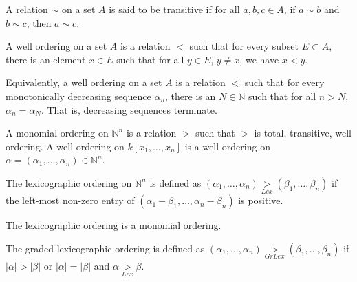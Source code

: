 \documentclass[crop=false,class=book,oneside]{standalone}
\begin{document}
            \begin{definition}
                A relation $\sim$ on a set $A$ is said to be
                transitive if for all $a,b,c\in A$, if $a\sim b$ and
                $b\sim c$, then $a\sim c$.
            \end{definition}
            \begin{definition}
                A well ordering on a set $A$ is a relation $<$
                such that for every subset $E\subset A$, there is an
                element $x\in E$ such that for all $y\in E$, $y\ne x$,
                we have $x<y$.
            \end{definition}
            \begin{remark}
                Equivalently, a well ordering on a set $A$
                is a relation $<$ such that for every monotonically
                decreasing sequence $\alpha_n$, there is an
                $N\in \mathbb{N}$ such that for all $n>N$,
                $\alpha_n = \alpha_N$. That is,
                decreasing sequences terminate.
            \end{remark}
            \begin{definition}
                A monomial ordering on $\mathbb{N}^n$ is a relation
                $>$ such that $>$ is total, transitive, well
                ordering. A well ordering on $k[x_1,\hdots ,x_n]$
                is a well ordering on
                $\alpha=(\alpha_1,\hdots,\alpha_n)\in\mathbb{N}^n$.
            \end{definition}
            \begin{definition}
                The lexicographic ordering on $\mathbb{N}^n$ is
                defined as
                $(\alpha_1,\hdots,\alpha_n)\underset{Lex}{>}%
                 (\beta_1,\hdots,\beta_n)$
                if the left-most non-zero entry of
                $(\alpha_1-\beta_1,\hdots, \alpha_n-\beta_n)$
                is positive.
            \end{definition}
            \begin{theorem}
                The lexicographic ordering is a monomial ordering.
            \end{theorem}
            \begin{definition}
                The graded lexicographic ordering is defined as
                $(\alpha_1,\hdots,\alpha_n)\underset{GrLex}{>}%
                 (\beta_1,\hdots, \beta_n)$
                if $|\alpha|>|\beta|$ or $|\alpha|=|\beta|$
                and $\alpha\underset{Lex}{>}\beta$.
            \end{definition}
\end{document}
